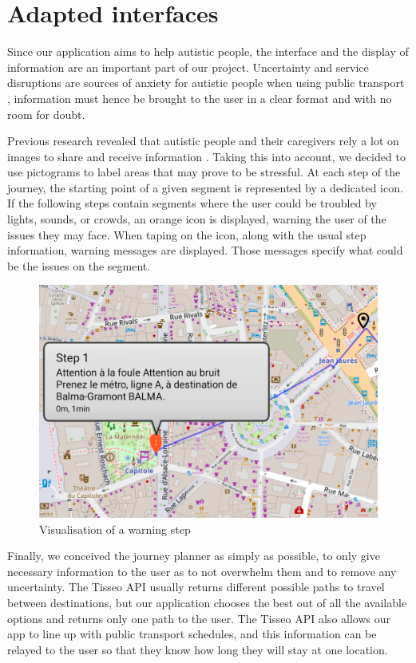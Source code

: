 \section{Adapted interfaces}


Since our application aims to help autistic people, the interface and the display of information are an important part of our project. Uncertainty and service disruptions are sources of anxiety for autistic people when using public transport \cite{2020ExperiencesYoungAutistic}, information must hence be brought to the user in a clear format and with no room for doubt.


Previous research revealed that autistic people and their caregivers rely a lot on images to share and receive information \cite{2018MobilityPoliciesExtraSmall}. Taking this into account, we decided to use pictograms to label areas that may prove to be stressful. At each step of the journey, the starting point of a given segment is represented by a dedicated icon. If the following steps contain segments where the user could be troubled by lights, sounds, or crowds, an orange icon is displayed, warning the user of the issues they may face. When taping on the icon, along with the usual step information, warning messages are displayed. Those messages specify what could be the issues on the segment.


\begin{figure}[H]
    \centering
    \includegraphics[scale=0.3]{img/step warning.png}
    \caption{Visualisation of a warning step}
    \label{fig:WarningStep}
\end{figure}


Finally, we conceived the journey planner as simply as possible, to only give necessary information to the user as to not overwhelm them and to remove any uncertainty. The Tisseo API usually returns different possible paths to travel between destinations, but our application chooses the best out of all the available options and returns only one path to the user. The Tisseo API also allows our app to line up with public transport schedules, and this information can be relayed to the user so that they know how long they will stay at one location.
